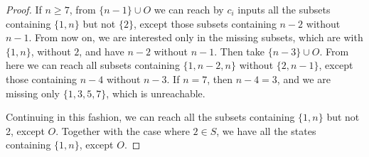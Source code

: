 \documentclass{llncs}
\renewcommand{\ge}{\geqslant}
\begin{document}
\begin{proof}
If $n\ge7$, from $\{n-1\}\cup O$ we can reach by $c_i$ inputs all the subsets containing   $\{1,n\}$ but not $\{2\}$, except those subsets containing $n-2$ without $n-1$.
From now on,  we are interested only in the missing subsets, which are with $\{1,n\}$, without $2$, and have $n-2$ without $n-1$.
Then take $\{n-3\}\cup O$. 
From here we can reach all subsets containing   $\{1,n-2,n\}$ without $\{2,n-1\}$, except those containing $n-4$ without $n-3$. If $n=7$, then $n-4=3$, and we are missing only 
$\{1,3,5,7\}$, which is unreachable.

Continuing in this fashion, we can reach all the subsets containing 
$\{1,n\}$ but not 2, except $O$. Together with the case where $2\in S$, we have all the states containing $\{1,n\}$,  except $O$.




\end{proof}
\end{document}
